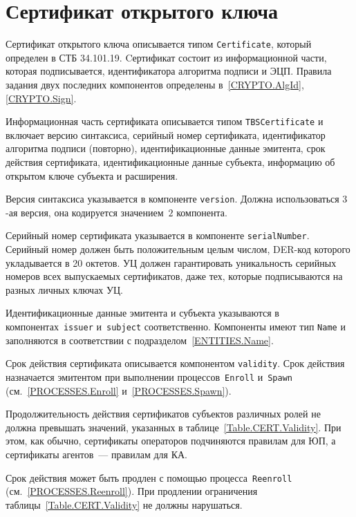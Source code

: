 \section{Сертификат открытого ключа}\label{FMT.Cert}

Сертификат открытого ключа описывается типом 
\texttt{Certificate}, который определен в СТБ 34.101.19.
%
Cертификат состоит из информационной части, которая 
подписывается, идентификатора алгоритма подписи и ЭЦП. 
Правила задания двух последних компонентов определены 
в~\ref{CRYPTO.AlgId}, \ref{CRYPTO.Sign}.

Информационная часть сертификата описывается типом 
\texttt{TBSCertificate} и включает версию синтаксиса, 
серийный номер сертификата, идентификатор алгоритма подписи (повторно), 
идентификационные данные эмитента, срок действия сертификата, 
идентификационные данные субъекта, информацию об открытом ключе 
субъекта и расширения. 

Версия синтаксиса указывается в компоненте \texttt{version}.
Должна использоваться $3$-ая версия, она кодируется значением~$2$
компонента.

Серийный номер сертификата указывается в компоненте \texttt{serialNumber}.
Серийный номер должен быть положительным целым числом, 
DER-код которого укладывается в 20 октетов.
%
УЦ должен гарантировать уникальность серийных 
номеров всех выпускаемых сертификатов, даже тех, которые 
подписываются на разных личных ключах УЦ.

Идентификационные данные эмитента и субъекта указываются в
компонентах~\texttt{issuer} и~\texttt{subject} соответственно. Компоненты
имеют тип \texttt{Name} и заполняются в соответствии с
подразделом~\ref{ENTITIES.Name}.

Срок действия сертификата описывается компонентом 
\texttt{validity}. Срок действия назначается эмитентом
при выполнении процессов~\texttt{Enroll} и~\texttt{Spawn}
(см.~\ref{PROCESSES.Enroll} и~\ref{PROCESSES.Spawn}). 

Продолжительность действия сертификатов субъектов различных ролей
не должна превышать значений, указанных в таблице~\ref{Table.CERT.Validity}. 
%
При этом, как обычно, сертификаты операторов подчиняются правилам для ЮП, 
а сертификаты агентов~--- правилам для КА.

Срок действия может быть продлен с помощью процесса~\texttt{Reenroll}
(см.~\ref{PROCESSES.Reenroll}). При продлении ограничения
таблицы~\ref{Table.CERT.Validity} не должны нарушаться.

